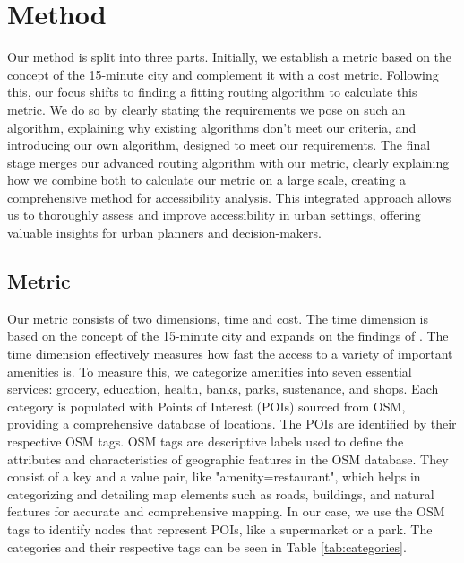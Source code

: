 \clearpage
\section{Method}
\label{sec:method}

Our method is split into three parts.
Initially, we establish a metric based on the concept of the 15-minute city and complement it with a cost metric.
Following this, our focus shifts to finding a fitting routing algorithm to calculate this metric.
We do so by clearly stating the requirements we pose on such an algorithm, explaining why existing algorithms don't meet our criteria, and introducing our own algorithm, designed to meet our requirements. 
The final stage merges our advanced routing algorithm with our metric, clearly explaining how we combine both to calculate our metric on a large scale, creating a comprehensive method for accessibility analysis. 
This integrated approach allows us to thoroughly assess and improve accessibility in urban settings, offering valuable insights for urban planners and decision-makers.

\subsection{Metric}
\label{subsec:metric}

Our metric consists of two dimensions, time and cost.
The time dimension is based on the concept of the 15-minute city and expands on the findings of \cite{olivariAreItalianCities2023}.
The time dimension effectively measures how fast the access to a variety of important amenities is.
To measure this, we categorize amenities into seven essential services: grocery, education, health, banks, parks, sustenance, and shops.
Each category is populated with Points of Interest (POIs) sourced from OSM, providing a comprehensive database of locations.
The POIs are identified by their respective OSM tags.
OSM tags are descriptive labels used to define the attributes and characteristics of geographic features in the OSM database. 
They consist of a key and a value pair, like "amenity=restaurant", which helps in categorizing and detailing map elements such as roads, buildings, and natural features for accurate and comprehensive mapping.
In our case, we use the OSM tags to identify nodes that represent POIs, like a supermarket or a park.
The categories and their respective tags can be seen in Table \ref{tab:categories}.

